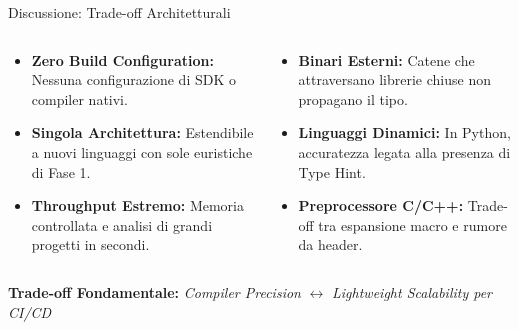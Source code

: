 \documentclass[aspectratio=169,10pt]{beamer}
\begin{document}
\begin{frame}{Discussione: Trade-off Architetturali}
  \vspace{0.1em}
  \begin{columns}[c,onlytextwidth]
      \begin{cookiecard}[title={Punti di Forza Dimostrati}]
        \small
        \begin{itemize}\setlength{\itemsep}{0.2em}
          \item \textbf{Zero Build Configuration:} Nessuna configurazione di SDK o compiler nativi.
          \item \textbf{Singola Architettura:} Estendibile a nuovi linguaggi con sole euristiche di Fase 1.
          \item \textbf{Throughput Estremo:} Memoria controllata e analisi di grandi progetti in secondi.
        \end{itemize}
      \end{cookiecard}

      \begin{cookiecard}[title={Compromessi Riconosciuti}]
        \small
        \begin{itemize}\setlength{\itemsep}{0.2em}
          \item \textbf{Binari Esterni:} Catene che attraversano librerie chiuse non propagano il tipo.
          \item \textbf{Linguaggi Dinamici:} In Python, accuratezza legata alla presenza di Type Hint.
          \item \textbf{Preprocessore C/C++:} Trade-off tra espansione macro e rumore da header.
        \end{itemize}
      \end{cookiecard}
  \end{columns}
  \vspace{0.4em}
  \centering
  {\small\textbf{Trade-off Fondamentale:} \textit{Compiler Precision} $\longleftrightarrow$ \textit{Lightweight Scalability per CI/CD}}

\end{frame}
\end{document}
